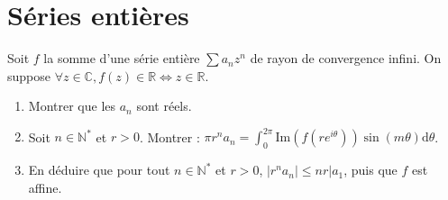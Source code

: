 \documentclass[french]{book}
\newcommand{\N}{\mathbb{N}}
\newcommand{\R}{\mathbb{R}}
\newcommand{\C}{\mathbb{C}}
\newcommand{\st}{^*}
\renewcommand{\d}{\text{d}}
\theoremstyle{definition}
\theoremstyle{remark}
\begin{document}
\chapter{Séries entières}

\begin{exo}[1]{}
	Soit $f$ la somme d'une série entière $\displaystyle\sum a_n z^n$ de rayon de convergence infini. On suppose $\forall z\in\C, f(z)\in\R\iff z\in\R$.
	\begin{enumerate}
		\item Montrer que les $a_n$ sont réels.
		\item Soit $n\in\N\st$ et $r>0$. Montrer : $\displaystyle\pi r^na_n=\int_{0}^{2\pi}\text{Im}(f(re^{i\theta}))\sin(m\theta)\d\theta$.
		\item En déduire que pour tout $n\in\N\st$ et $r>0$, $\lvert r^na_n\rvert\leqslant nr\lvert a_1$, puis que $f$ est affine.
	\end{enumerate}
\end{exo}
\end{document}
